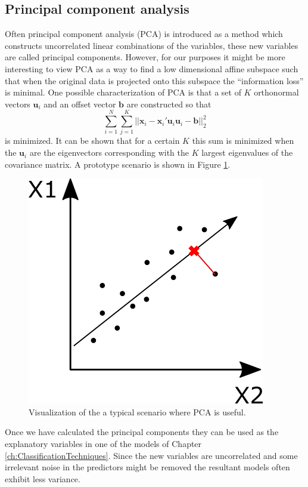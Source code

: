 \subsection{Principal component analysis}
Often principal component analysis (PCA) is introduced as a method which constructs uncorrelated linear combinations of the variables, these new variables are called principal components. However, for our purposes it might be more interesting to view PCA as a way to find a low dimensional affine subspace such that when the original data is projected onto this subspace the ``information loss'' is minimal. One possible characterization of PCA is that a set of $K$ orthonormal vectors $\bm{u}_i$ and an offset vector $\bm{b}$ are constructed so that
\[\sum_{i=1}^{N} \sum_{j=1}^{K} \vert \vert \bm{x}_i - \bm{x}_i'\bm{u}_i\bm{u}_i - \bm{b} \vert \vert_2^2 \]
is minimized. It can be shown that for a certain $K$ this sum is minimized when the $\bm{u}_i$ are the eigenvectors corresponding with the $K$ largest eigenvalues of the covariance matrix. A prototype scenario is shown in Figure \ref{fig:PCA}.\\

\begin{figure}[!htb]
\centering
\includegraphics[scale=0.5]{VectorGraphics/PCA.png}
\caption{\label{fig:PCA}Visualization of the a typical scenario where PCA is useful.}
\end{figure} 


Once we have calculated the principal components they can be used as the explanatory variables in one of the models of Chapter \ref{ch:ClassificationTechniques}. Since the new variables are uncorrelated and some irrelevant noise in the predictors might be removed the resultant models often exhibit less variance. \\

